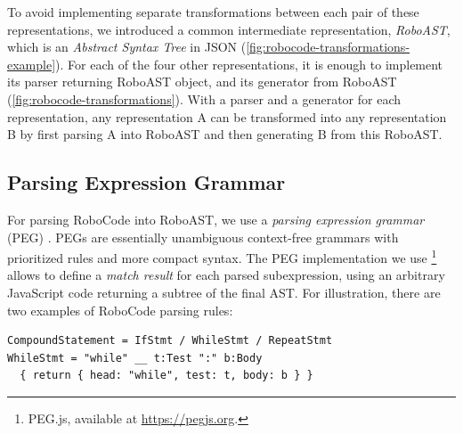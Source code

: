 To avoid implementing separate transformations between each pair of these
representations, we introduced a common intermediate representation,
\emph{RoboAST}, which is an %
\emph{Abstract Syntax Tree} \cite{ast} in JSON
(\cref{fig:robocode-transformations-example}).
For each of the four other representations, it is enough to implement
its parser returning RoboAST object, and
its generator from RoboAST (\cref{fig:robocode-transformations}).
With a parser and a generator for each representation,
any representation A can be transformed into any representation B
by first parsing A into RoboAST and then generating B from this RoboAST.




\subsection{Parsing Expression Grammar}

For parsing RoboCode into RoboAST, we use a \emph{parsing expression grammar}
(PEG) \cite{peg}.
PEGs are essentially unambiguous context-free grammars with prioritized rules
and more compact syntax.
The PEG implementation we use%
\footnote{PEG.js, available at \url{https://pegjs.org}.}
allows to define a \emph{match result} for each parsed subexpression,
using an arbitrary JavaScript code returning a subtree of the final AST.
For illustration, there are
two %
examples of RoboCode parsing rules:

\begin{lstlisting}
CompoundStatement = IfStmt / WhileStmt / RepeatStmt
WhileStmt = "while" __ t:Test ":" b:Body
  { return { head: "while", test: t, body: b } }
\end{lstlisting}

